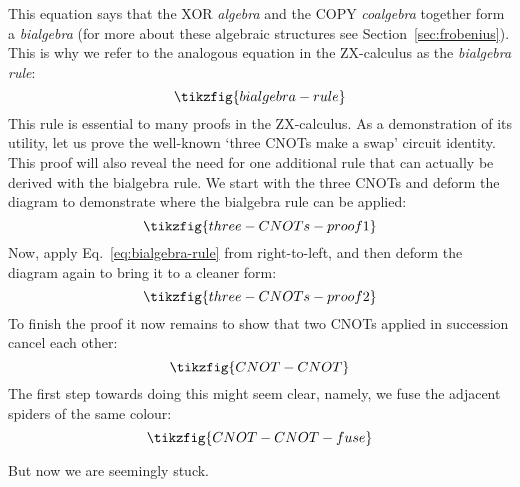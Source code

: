 \documentclass[a4paper,onecolumn,superscriptaddress,11pt,%
				unpublished,%
				allowfontchageintitle,%
				]{quantumarticle}
\begin{document}
This equation says that the XOR \emph{algebra} and the COPY \emph{coalgebra} together form a \emph{bialgebra} (for more about these algebraic structures see Section~\ref{sec:frobenius}). This is why we refer to the analogous equation in the ZX-calculus as the \emph{bialgebra rule}:
\begin{equation}\label{eq:bialgebra-rule}
\tikzfig{bialgebra-rule}
\end{equation}
This rule is essential to many proofs in the ZX-calculus. As a demonstration of its utility, let us prove the well-known `three CNOTs make a swap' circuit identity. This proof will also reveal the need for one additional rule that can actually be derived with the bialgebra rule.
We start with the three CNOTs and deform the diagram to demonstrate where the bialgebra rule can be applied:
\begin{equation}
\tikzfig{three-CNOTs-proof1}
\end{equation}
Now, apply Eq.~\eqref{eq:bialgebra-rule} from right-to-left, and then deform the diagram again to bring it to a cleaner form:
\begin{equation}
\tikzfig{three-CNOTs-proof2}
\end{equation}
To finish the proof it now remains to show that two CNOTs applied in succession cancel each other:
\begin{equation}
\tikzfig{CNOT-CNOT}
\end{equation}
The first step towards doing this might seem clear, namely, we fuse the adjacent spiders of the same colour:
\begin{equation}\label{eq:CNOT-CNOT-fuse}
\tikzfig{CNOT-CNOT-fuse}
\end{equation}

But now we are seemingly stuck.
\end{document}
